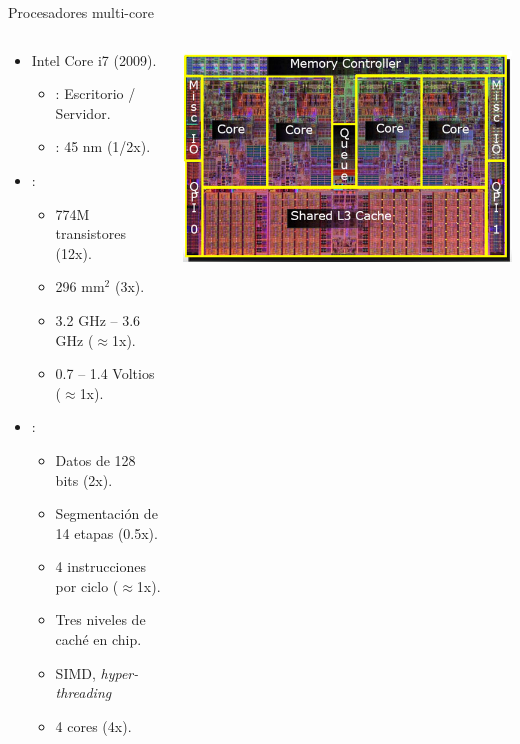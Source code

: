 \begin{frame}[t,shrink=20]{Procesadores multi-core}
\begin{columns}[T]
  \begin{column}{.65\textwidth}
    \begin{itemize}
      \item Intel Core i7 (2009).
        \begin{itemize}
          \item {}: Escritorio / Servidor.
          \item {}: 45 nm (1/2x).
        \end{itemize}
      \item {}:
        \begin{itemize}
          \item 774M transistores (12x).
          \item 296 mm$^2$ (3x).
          \item 3.2 GHz -- 3.6 GHz ($\approx$1x).
          \item 0.7 -- 1.4 Voltios ($\approx$1x).
        \end{itemize}
      \item {}:
        \begin{itemize}
          \item Datos de 128 bits (2x).
          \item Segmentación de 14 etapas (0.5x).
          \item 4 instrucciones por ciclo ($\approx$1x).
          \item Tres niveles de caché en chip.
          \item SIMD, \emph{hyper-threading}
          \item 4 cores (4x).
        \end{itemize} 
    \end{itemize}
  \end{column}
  \begin{column}{.35\textwidth}
    \includegraphics[width=.9\textwidth]{images/intel-core-i7-die.jpg}\\

\end{column}
\end{columns}
\end{frame}
